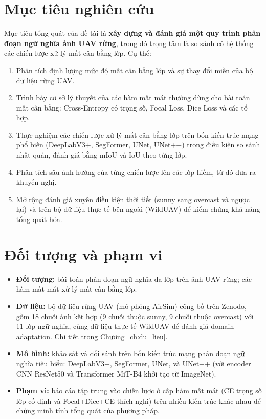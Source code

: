 \section{Mục tiêu nghiên cứu}

Mục tiêu tổng quát của đề tài là \textbf{xây dựng và đánh giá một quy trình phân
đoạn ngữ nghĩa ảnh UAV rừng}, trong đó trọng tâm là so sánh có hệ thống các chiến
lược xử lý mất cân bằng lớp. Cụ thể:

\begin{enumerate}[leftmargin=1.4cm]
  \item Phân tích định lượng mức độ mất cân bằng lớp và sự thay đổi miền của bộ dữ
  liệu rừng UAV.
  \item Trình bày cơ sở lý thuyết của các hàm mất mát thường dùng cho bài toán mất
  cân bằng: Cross-Entropy có trọng số, Focal Loss, Dice Loss và các tổ hợp.
  \item Thực nghiệm các chiến lược xử lý mất cân bằng lớp trên bốn kiến trúc mạng phổ biến (DeepLabV3+, SegFormer, UNet, UNet++) trong điều kiện so sánh nhất quán, đánh giá bằng mIoU và IoU theo từng lớp.
  \item Phân tích sâu ảnh hưởng của từng chiến lược lên các lớp hiếm, từ đó đưa ra khuyến nghị.
  \item Mở rộng đánh giá xuyên điều kiện thời tiết (sunny sang overcast và ngược lại) và trên bộ dữ liệu thực tế bên ngoài (WildUAV) để kiểm chứng khả năng tổng quát hóa.
\end{enumerate}

\section{Đối tượng và phạm vi}

\begin{itemize}[leftmargin=1.4cm]
  \item \textbf{Đối tượng:} bài toán phân đoạn ngữ nghĩa đa lớp trên ảnh UAV rừng;
  các hàm mất mát xử lý mất cân bằng lớp.
  \item \textbf{Dữ liệu:} bộ dữ liệu rừng UAV (mô phỏng AirSim) công bố trên Zenodo, gồm 18 chuỗi ảnh kết hợp (9 chuỗi thuộc sunny, 9 chuỗi thuộc overcast) với 11 lớp ngữ nghĩa, cùng dữ liệu thực tế WildUAV để đánh giá domain adaptation. Chi tiết trong Chương~\ref{ch:du_lieu}.
  \item \textbf{Mô hình:} khảo sát và đối sánh trên bốn kiến trúc mạng phân đoạn ngữ nghĩa tiêu biểu: DeepLabV3+, SegFormer, UNet, và UNet++ (với encoder CNN ResNet50 và Transformer MiT-B4 khởi tạo từ ImageNet).
  \item \textbf{Phạm vi:} báo cáo tập trung vào chiến lược ở cấp hàm mất mát (CE trọng số lớp cố định và Focal+Dice+CE thích nghi) trên nhiều kiến trúc khác nhau để chứng minh tính tổng quát của phương pháp.
\end{itemize}

